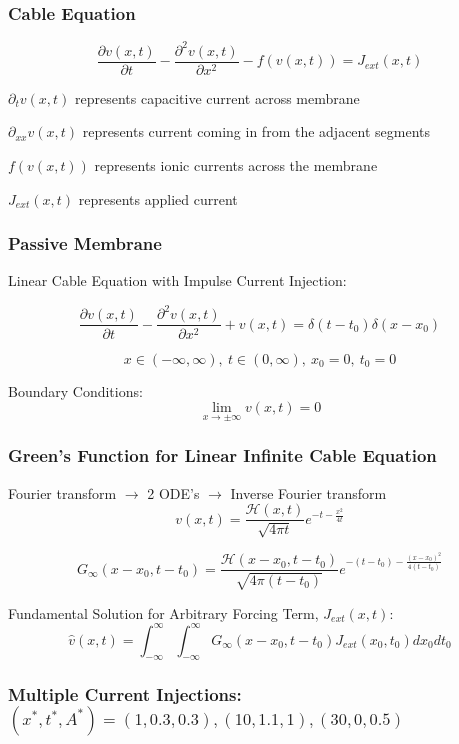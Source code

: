 \documentclass{beamer}
\begin{document}
\begin{frame}
\frametitle{Cable Equation}
\[\frac{\partial{v(x,t)}}{\partial{t}} - \frac{\partial^2{v(x,t)}}{\partial{x}^2} - f(v(x,t))= J_{ext}(x,t)\] \newline

$ \partial_t{v(x,t)} $ represents capacitive current across membrane \newline 

$ \partial_{xx}{v(x,t)} $ represents current coming in from the adjacent segments \newline 

$  f(v(x,t))$ represents ionic currents across the membrane \newline 

$ J_{ext}(x,t)$ represents applied current
\end{frame}


\begin{frame}
\frametitle{Passive Membrane}
Linear Cable Equation with Impulse Current Injection:

$$\frac{\partial{v(x,t)}}{\partial{t}} - \frac{\partial^2{v(x,t)}}{\partial{x}^2} + v(x,t)=\delta(t-t_0)\delta(x-x_0)$$ 

$$x \in (-\infty, \infty),\ t \in (0,\infty),\ x_0 = 0,\ t_0 = 0$$ \newline

Boundary Conditions:
$$\lim_{x\to \pm \infty} v(x,t) = 0$$
\end{frame}

\begin{frame}
\frametitle{Green's Function for Linear Infinite Cable Equation}
Fourier transform $\rightarrow$ 2 ODE's $\rightarrow$ Inverse Fourier transform
$$ v(x,t) = \frac{\mathcal{H}(x,t)}{\sqrt{4\pi t}}e^{-t-\frac{x^2}{4t}} $$ 

$$  G_{\infty}(x-x_0,t-t_0) = \frac{\mathcal{H}(x-x_0,t-t_0)}{\sqrt{4\pi (t-t_0)}}e^{-(t-t_0)-\frac{(x-x_0)^2}{4(t-t_0)}}$$\newline

Fundamental Solution for Arbitrary Forcing Term, $J_{ext}(x,t)$:
$$ \hat{v}(x,t) = \int_{-\infty}^{\infty}\int_{-\infty}^{\infty}G_{\infty}(x-x_0,t-t_0)J_{ext}(x_0,t_0)dx_0dt_0 $$
\end{frame}

\begin{frame}
\frametitle{Multiple Current Injections: $(x^*,t^*,A^*) = (1, 0.3, 0.3), (10,1.1,1), (30,0,0.5)$}
	
\end{frame}
\end{document}
